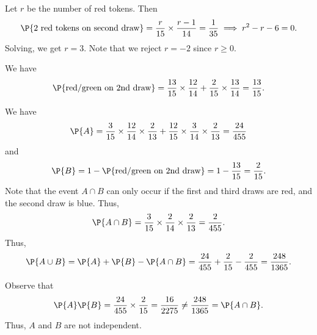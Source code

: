 \begin{solution}
    \begin{ppart}
        Let $r$ be the number of red tokens. Then \[\P{\text{2 red tokens on second draw}} = \frac{r}{15} \times \frac{r-1}{14} = \frac1{35} \implies r^2 - r - 6 = 0.\] Solving, we get $r = 3$. Note that we reject $r = -2$ since $r \geq 0$.
    \end{ppart}
    \begin{ppart}
        We have \[\P{\text{red/green on 2nd draw}} = \frac{13}{15} \times \frac{12}{14} + \frac{2}{15} \times \frac{13}{14} = \frac{13}{15}.\]
    \end{ppart}
    \begin{ppart}
        We have \[\P{A} = \frac{3}{15} \times \frac{12}{14} \times \frac{2}{13} + \frac{12}{15} \times \frac{3}{14} \times \frac{2}{13} = \frac{24}{455}\] and \[\P{B} = 1 - \P{\text{red/green on 2nd draw}} = 1 - \frac{13}{15} = \frac{2}{15}.\] Note that the event $A \cap B$ can only occur if the first and third draws are red, and the second draw is blue. Thus, \[\P{A \cap B} = \frac{3}{15} \times \frac{2}{14} \times \frac{2}{13} = \frac{2}{455}.\] Thus, \[\P{A \cup B} = \P{A} + \P{B} - \P{A \cap B} = \frac{24}{455} + \frac{2}{15} - \frac{2}{455} = \frac{248}{1365}.\]
    \end{ppart}
    \begin{ppart}
        Observe that \[\P{A} \P{B} = \frac{24}{455} \times \frac{2}{15} = \frac{16}{2275} \neq \frac{248}{1365} = \P{A \cap B}.\] Thus, $A$ and $B$ are not independent.
    \end{ppart}
\end{solution}

